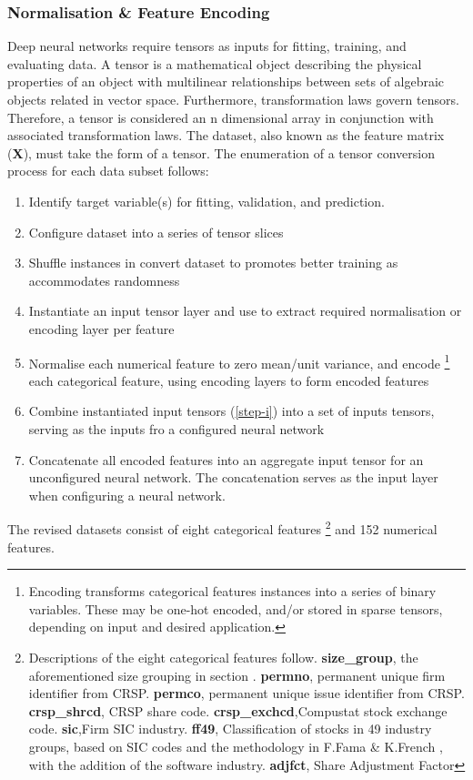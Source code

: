\documentclass[12pt]{article}
\begin{document}
\subsubsection*{Normalisation \& Feature Encoding}
Deep neural networks require tensors as inputs for fitting, training, and evaluating data.
A tensor is a mathematical object describing the physical properties of an object with multilinear relationships between sets of algebraic objects related in vector space.
Furthermore, transformation laws govern tensors. 
Therefore, a tensor is considered an n dimensional array in conjunction with associated transformation laws.
The dataset, also known as the feature matrix (\textbf{X}), must take the form of a tensor.
The enumeration of a tensor conversion process for each data subset follows:
\singlespacing
\begin{enumerate} 
\item Identify target variable(s) for fitting, validation, and prediction.
\item Configure dataset into a series of tensor slices
\item Shuffle instances in convert dataset to promotes better training as accommodates randomness
\item Instantiate an input tensor layer and use to extract required normalisation or encoding layer per feature \label{step-i}
\item Normalise each numerical feature to zero mean/unit variance, and encode 
\footnote{Encoding transforms categorical features instances into a series of binary variables.
These may be one-hot encoded, and/or stored in sparse tensors, depending on input and desired application.} 
each categorical feature, using encoding layers to form encoded features
\item Combine instantiated input tensors (\ref{step-i}) into a set of inputs tensors, serving as the inputs fro a configured neural network
\item Concatenate all encoded features into an aggregate input tensor for an unconfigured neural network. 
The concatenation serves as the input layer when configuring a neural network.
\end{enumerate}
\doublespacing
The revised datasets consist of eight categorical features
\footnote{Descriptions of the eight categorical features follow. 
\textbf{size\_group}, the aforementioned size grouping in section \label{data-processing}. 
\textbf{permno}, permanent unique firm identifier from CRSP.
\textbf{permco}, permanent unique issue identifier from CRSP.
\textbf{crsp\_shrcd}, CRSP share code.
\textbf{crsp\_exchcd},Compustat stock exchange code.
\textbf{sic},Firm SIC industry.
\textbf{ff49}, Classification of stocks in 49 industry groups, based on SIC codes and the methodology in F.Fama \& K.French \citeyear{fama1997industry}, with the addition of the software industry.
\textbf{adjfct}, Share Adjustment Factor}
and 152 numerical features.
\end{document}

